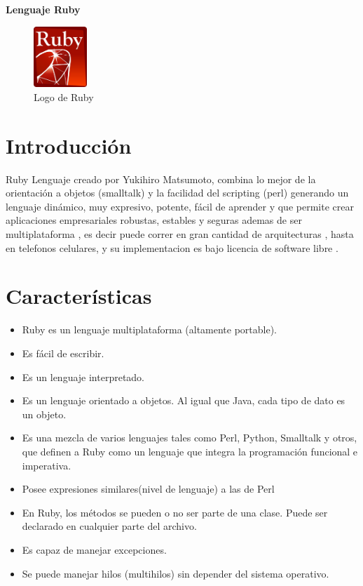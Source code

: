 \documentclass[11pt]{article} %
\begin{document}
\newpage
\begin{center}
 {\fontsize{16}{0} \bf Lenguaje Ruby}
\end{center}

\begin{figure}[h]
\centering
 \includegraphics[width=2cm]{./imagenes/ruby.jpg}
\caption{Logo de Ruby }\label{Fig:Ruby}
\end{figure}


\section{\fontsize{16}{0} \bf Introducción}

 Ruby  Lenguaje creado por Yukihiro Matsumoto,  combina lo mejor de la orientación a objetos (smalltalk) y la facilidad del scripting (perl) generando un lenguaje dinámico, muy expresivo, potente, fácil de aprender y que permite crear aplicaciones empresariales robustas, estables y seguras ademas de ser  multiplataforma , es decir puede correr en gran cantidad de arquitecturas , hasta en telefonos celulares, y su implementacion es bajo licencia de software libre .


\section{\fontsize{14}{0} \bf Características}

\begin{itemize}

      \item  Ruby es un lenguaje multiplataforma (altamente portable).
      \item  Es fácil de escribir. 
      \item  Es un lenguaje interpretado.
      \item  Es un lenguaje orientado a objetos. Al igual que Java, cada tipo de dato es un objeto.
      \item  Es una mezcla de varios lenguajes tales como Perl, Python, Smalltalk y otros, que definen a Ruby como un lenguaje que integra la programación funcional e imperativa.
      \item  Posee expresiones similares(nivel de lenguaje) a las de Perl
      \item  En Ruby, los métodos se pueden o no ser parte de una clase. Puede ser declarado en cualquier parte del archivo.
      \item  Es capaz de manejar excepciones.
      \item  Se puede manejar hilos (multihilos) sin depender del sistema operativo.

\end{itemize}
\end{document}
